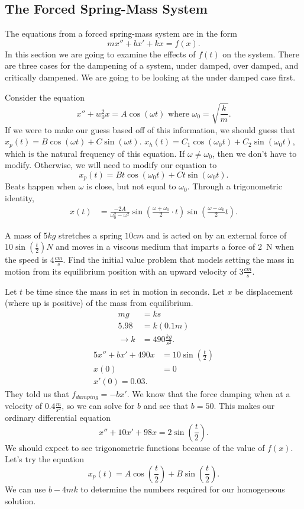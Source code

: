 \subsection{The Forced Spring-Mass System}

The equations from a forced spring-mass system are in the form 
\[
  mx''+bx'+kx=f(x)
.\] 
In this section we are going to examine the effects of $f(t)$ on the system. There are three cases for the dampening of a system, under damped, over damped, and critically dampened. We are going to be looking at the under damped case first.
\begin{eg}
  Consider the equation 
  \[
    x''+w_0^2x=A\cos(\omega t) \text{ where $\omega_0=\sqrt{\frac{k}{m}} $}
  .\] 
  If we were to make our guess based off of this information, we should guess that $x_p(t)=B\cos(\omega t) + C\sin(\omega t)$. $x_h(t)=C_1\cos(\omega_0 t)+C_2\sin(\omega_0 t)$, which is the natural frequency of this equation. If $\omega\neq\omega_0$, then we don't have to modify. Otherwise, we will need to modify our equation to 
  \[
    x_p(t)=Bt\cos(\omega_0 t)+Ct\sin(\omega_0 t)
  .\] 
  Beats happen when $\omega$ is close, but not equal to $\omega_0$. Through a trigonometric identity,
  \begin{align*}
    x(t)&=\frac{-2A}{\omega_0^2-\omega^2}\sin\left( \frac{\omega+\omega_0}{2}\cdot t \right) \sin\left( \frac{\omega-\omega_0}{2}t \right)
  .\end{align*}
\end{eg}
\begin{eg}
  A mass of $5kg$ stretches a spring $10cm$ and is acted on by an external force of $10\sin\left( \frac{t}{2} \right) N$ and moves in a viscous medium that imparts a force of 2 N when the speed is $4 \frac{cm}{s}$. Find the initial value problem that models setting the mass in motion from its equilibrium position with an upward velocity of $3 \frac{cm}{s}$.\par
  Let $t$ be time since the mass in set in motion in seconds. Let $x$ be displacement (where up is positive) of the mass from equilibrium.
  \begin{align*}
    mg&=ks\\
    5.98&=k(0.1m)\\
    \to k&=490 \frac{kg}{s^2}
  .\end{align*}
  \begin{align*}
    5x''+bx'+490x&=10\sin\left( \frac{t}{2} \right) \\
    x(0)&=0\\
    x'(0)=0.03
  .\end{align*}
  They told us that $f_{damping}=-bx'$. We know that the force damping when at a velocity of $0.4 \frac{m}{s^2}$, so we can solve for $b$ and see that $b=50$. This makes our ordinary differential equation 
  \[
  x''+10x'+98x=2\sin\left( \frac{t}{2} \right) 
  .\] 
  We should expect to see trigonometric functions because of the value of $f(x)$. Let's try the equation
  \[
    x_p(t)=A\cos\left( \frac{t}{2} \right) +B\sin\left( \frac{t}{2} \right) 
  .\] 
  We can use $b-4mk$ to determine the numbers required for our homogeneous solution.
\end{eg}

